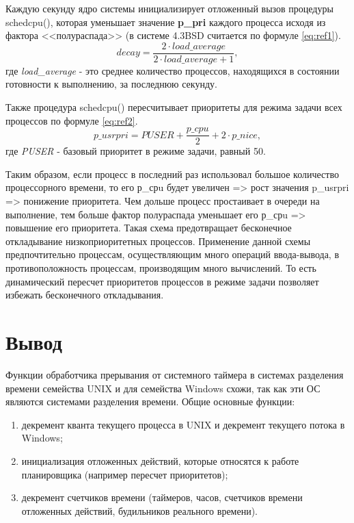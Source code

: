 Каждую секунду ядро системы инициализирует отложенный вызов процедуры schedcpu(), которая уменьшает значение \textbf{p\_pri} каждого процесса исходя из фактора <<полураспада>> (в системе 4.3BSD считается по формуле \ref{eq:ref1}).
\begin{equation}
	\label{eq:ref1}
	decay = \frac{2 \cdot load\_average}{2 \cdot load\_average + 1},
\end{equation} где
\textit{load\_average} - это среднее количество процессов, находящихся в состоянии готовности к выполнению, за последнюю секунду.

Также процедура schedcpu() пересчитывает приоритеты для режима задачи
всех процессов по формуле \ref{eq:ref2}.
\begin{equation}
	\label{eq:ref2}
	p\_usrpri = PUSER + \frac{p\_cpu}{2} + 2 \cdot p\_nice,
\end{equation}где \textit{PUSER} - базовый приоритет в режиме задачи, равный 50.

Таким образом, если процесс в последний раз использовал большое количество процессорного времени, то его р\_срu будет увеличен => рост значения p\_usrpri => понижение приоритета.  Чем дольше процесс простаивает в очереди на выполнение, тем больше фактор полураспада уменьшает его р\_срu => повышение его приоритета. Такая схема предотвращает бесконечное откладывание низкоприоритетных процессов. Применение данной схемы предпочтительно процессам, осуществляющим много операций ввода-вывода, в противоположность процессам, производящим много вычислений. То есть динамический пересчет приоритетов процессов в режиме задачи позволяет избежать бесконечного откладывания.


\chapter{Вывод}
Функции обработчика прерывания от системного таймера в системах разделения времени семейства UNIX и для семейства Windows схожи, так как эти ОС являются системами разделения времени. Общие основные функции:
\begin{enumerate}[label=\arabic*)]
	\item декремент кванта текущего процесса в UNIX и декремент текущего потока в Windows;
	\item инициализация отложенных действий, которые относятся к работе планировщика (например пересчет приоритетов);
	\item декремент счетчиков времени (таймеров, часов, счетчиков времени отложенных действий, будильников реального времени).
\end{enumerate}

